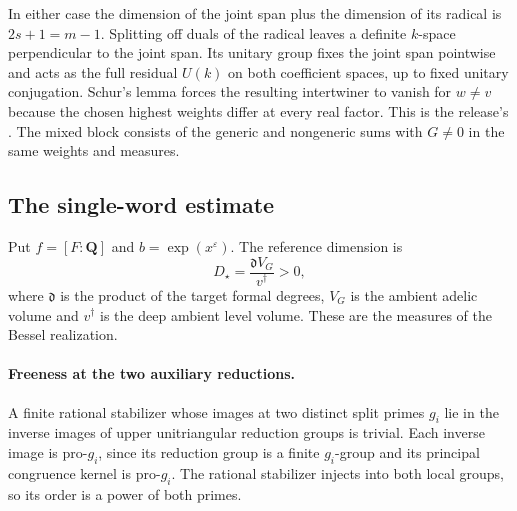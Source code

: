 In either case the dimension of the joint span plus the dimension of
its radical is \(2s+1=m-1\). Splitting off duals of the radical
leaves a definite \(k\)-space perpendicular to the joint span.
Its unitary group fixes the joint span pointwise and acts as the
full residual \(U(k)\) on both coefficient spaces, up to fixed
unitary conjugation. Schur's lemma forces the resulting intertwiner
to vanish for \(w\ne v\) because the chosen highest weights differ at
every real factor. This is the release's
.
The mixed block consists of the generic and nongeneric sums with
\(G\ne0\) in the same weights and measures.

\subsection{The single-word estimate}

Put \(f=[F:\mathbf Q]\) and \(b=\exp(x^\varepsilon)\). The reference
dimension is
\[
 D_\star=\frac{\mathfrak d V_G}{v^\dagger}>0,
\]
where \(\mathfrak d\) is the product of the target formal degrees,
\(V_G\) is the ambient adelic volume and \(v^\dagger\) is the deep
ambient level volume. These are the measures of the Bessel realization.
\paragraph{Freeness at the two auxiliary reductions.}
\leavevmode{}%
A finite rational stabilizer whose images at two distinct split
primes \(g_i\) lie in the inverse images of upper unitriangular
reduction groups is trivial. Each inverse image is pro-\(g_i\),
since its reduction group is a finite \(g_i\)-group and its
principal congruence kernel is pro-\(g_i\). The rational stabilizer
injects into both local groups, so its order is a power of both
primes.

